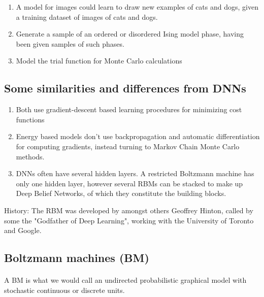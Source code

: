 \documentclass[aip,jcp,reprint,floatfix]{revtex4-1}
\begin{document}
\begin{itemize}
\begin{itemize}
\begin{enumerate}
 \item A model for images could learn to draw new examples of cats and dogs, given a training dataset of images of cats and dogs.

 \item Generate a sample of an ordered or disordered Ising model phase, having been given samples of such phases.

 \item Model the trial function for Monte Carlo calculations
\end{enumerate}

\noindent
\end{itemize}

\noindent
\subsection*{Some similarities and differences from DNNs}

\begin{enumerate}
\item Both use gradient-descent based learning procedures for minimizing cost functions

\item Energy based models don't use backpropagation and automatic differentiation for computing gradients, instead turning to Markov Chain Monte Carlo methods.

\item DNNs often have several hidden layers. A restricted Boltzmann machine has only one hidden layer, however several RBMs can be stacked to make up Deep Belief Networks, of which they constitute the building blocks.
\end{enumerate}

\noindent
History: The RBM was developed by amongst others Geoffrey Hinton, called by some the "Godfather of Deep Learning", working with the University of Toronto and Google.


\subsection*{Boltzmann machines (BM)}


\paragraph{}
A BM is what we would call an undirected probabilistic graphical model
with stochastic continuous or discrete units.




\end{itemize}
\end{document}
